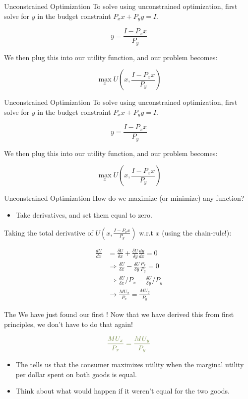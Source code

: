 \documentclass[11pt,t]{beamer}
\begin{document}
\begin{frame}{Unconstrained Optimization}
  To solve using unconstrained optimization, first solve for $y$ in the budget constraint $P_x x + P_y y = I$.

  $$
    y  = \frac{I - P_x x}{P_y} 
  $$

  \pause\bigskip
  We then plug this into our utility function, and our problem becomes:

  $$
    \max_x U(x,\frac{I - P_x x}{P_y}) 
  $$
\end{frame}

\begin{frame}{Unconstrained Optimization}
  To solve using unconstrained optimization, first solve for $y$ in the budget constraint $P_x x + P_y y = I$.

  $$
    y  = \frac{I - P_x x}{P_y} 
  $$

  \pause\bigskip
  We then plug this into our utility function, and our problem becomes:

  $$
    \max_x U(x,\frac{I - P_x x}{P_y}) 
  $$
\end{frame}


\begin{frame}{Unconstrained Optimization}
  How do we maximize (or minimize) any function? \pause
  \begin{itemize}
    \item Take derivatives, and set them equal to zero.
  \end{itemize}
  
  Taking the total derivative of $U(x,\frac{I - P_x x}{P_y})$ w.r.t $x$ (using the chain-rule!):

  \begin{align*}
    \frac{dU}{dx} & =\frac{\delta U}{\delta x} +\frac{\delta U}{\delta y}\frac{dy}{dx} = 0 \\
    &\Rightarrow \frac{\delta U}{\delta x} -\frac{\delta U}{\delta y}\frac{P_x}{P_y} =0 \\
    &\Rightarrow \frac{\delta U}{\delta x}/{P_x} = \frac{\delta U}{\delta y} /{P_y} \\
    &\rightarrow \frac{MU_x}{P_x} = \frac{MU_y} {P_y}
  \end{align*}
\end{frame}

\begin{frame}{The }
  We have just found our first ! Now that we have derived this from first principles, we don't have to do that again!

  $$
    \kelly{\frac{MU_x}{P_x} = \frac{MU_y}{P_y}}
  $$

  \pause\bigskip
  \begin{itemize}
    \item The  tells us that the consumer maximizes utility when the marginal utility per dollar spent on both goods is equal.
    \item Think about what would happen if it weren't equal for the two goods.
  \end{itemize}
\end{frame}
\end{document}
